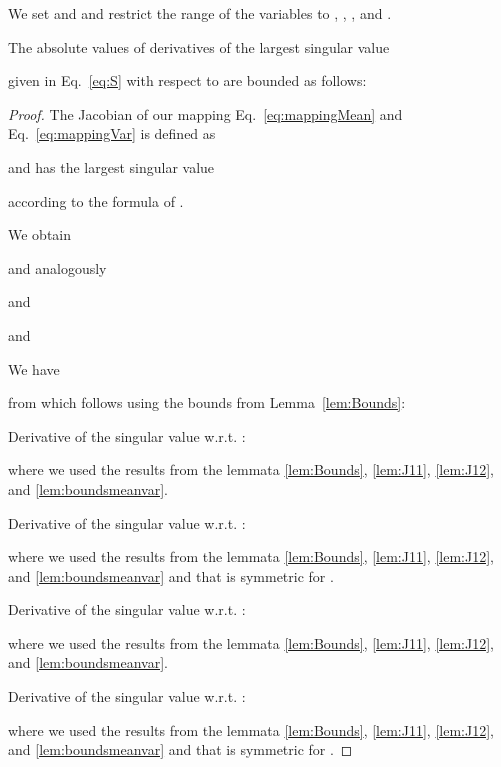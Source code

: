 \documentclass{article}
\begin{document}
\begin{lemma}
\label{lem:Ds1Bounds}
We set
 and  and
restrict the range of the variables to
,
,
, and
.

The absolute values of derivatives of the largest singular value

given in Eq.~\eqref{eq:S} with respect to
 are bounded as follows:









\end{lemma}
\begin{proof}

The Jacobian of our mapping  Eq.~\eqref{eq:mappingMean} and 
Eq.~\eqref{eq:mappingVar} is defined as


and has the largest singular value

according to the formula of \citet{Blinn:96}.

We obtain

and analogously 

and

and


We have

from which follows using the bounds from Lemma~\ref{lem:Bounds}:

Derivative of the singular value w.r.t. :

where we used the results from the lemmata \ref{lem:Bounds}, \ref{lem:J11}, \ref{lem:J12}, and \ref{lem:boundsmeanvar}.

Derivative of the singular value w.r.t. :

where we used the results from the lemmata \ref{lem:Bounds}, \ref{lem:J11}, \ref{lem:J12}, and \ref{lem:boundsmeanvar} and that
 is symmetric for .

Derivative of the singular value w.r.t. :

where we used the results from the lemmata \ref{lem:Bounds}, \ref{lem:J11}, \ref{lem:J12}, and \ref{lem:boundsmeanvar}.


Derivative of the singular value w.r.t. :

where we used the results from the lemmata \ref{lem:Bounds}, \ref{lem:J11}, \ref{lem:J12}, and \ref{lem:boundsmeanvar} and that
 is symmetric for  .

\end{proof}
\end{document}
